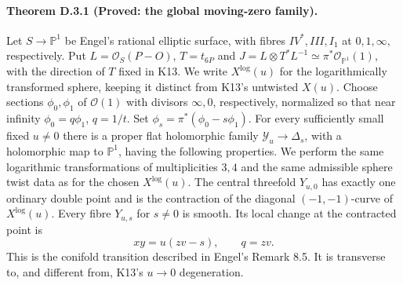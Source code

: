 \paragraph{Theorem D.3.1 (Proved: the global moving-zero family).}
Let $S\to\mathbb P^1$ be Engel's rational elliptic surface, with
fibres $IV^*,III,I_1$ at $0,1,\infty$, respectively. Put
$L=\mathcal O_S(P-O)$, $T=t_{6P}$ and
$J=L\otimes T^*L^{-1}\simeq\pi^*\mathcal O_{\mathbb P^1}(1)$,
with the direction of $T$ fixed in K13. We write $X^{\log}(u)$ for
the logarithmically transformed sphere, keeping it distinct from K13's
untwisted $X(u)$. Choose sections
$\phi_0,\phi_1$ of $\mathcal O(1)$ with divisors $\infty,0$,
respectively, normalized so that near infinity
$\phi_0=q\phi_1$, $q=1/t$. Set
$\phi_s=\pi^*(\phi_0-s\phi_1)$.
For every sufficiently small fixed $u\ne0$ there is a proper flat
holomorphic family $\mathcal Y_u\to\Delta_s$, with a holomorphic
map to $\mathbb P^1$, having the following properties. We perform
the same logarithmic transformations of multiplicities $3,4$ and
the same admissible sphere twist data as for the chosen $X^{\log}(u)$.
The central threefold $Y_{u,0}$ has exactly one ordinary double point
and is the contraction of the diagonal $(-1,-1)$-curve of $X^{\log}(u)$.
Every fibre $Y_{u,s}$ for $s\ne0$ is smooth. Its local change at the
contracted point is
\[
 xy=u(zv-s),\qquad q=zv.
\]
This is the conifold transition described in Engel's Remark 8.5.
It is transverse to, and different from, K13's $u\to0$ degeneration.
